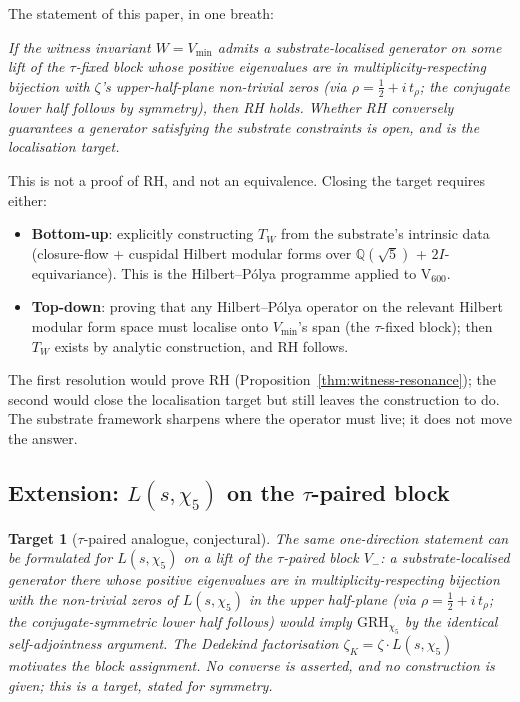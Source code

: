 \documentclass[11pt,a4paper]{article}
\newtheorem{target}[theorem]{Target}
\newcommand{\Q}{\mathbb{Q}}
\newcommand{\Vmin}{V_{\min}}
\newcommand{\Wit}{W}
\newcommand{\Twit}{T_W}
\begin{document}
\begin{equivbox}
The statement of this paper, in one breath:

\medskip
\noindent\itshape
If the witness invariant $\Wit = \Vmin$ admits a
substrate-localised generator on some lift of the $\tau$-fixed
block whose positive eigenvalues are in multiplicity-respecting
bijection with $\zeta$'s upper-half-plane non-trivial zeros (via
$\rho = \tfrac12 + i\,t_\rho$; the conjugate lower half follows
by symmetry), then RH holds. Whether RH conversely
guarantees a generator satisfying the substrate constraints is
open, and is the localisation target.

\medskip
\noindent\upshape
This is not a proof of RH, and not an equivalence. Closing the
target requires either:

\begin{itemize}[leftmargin=*]
  \item \textbf{Bottom-up}: explicitly constructing $\Twit$ from
        the substrate's intrinsic data (closure-flow + cuspidal
        Hilbert modular forms over $\Q(\sqrt 5)$ + $2I$-
        equivariance). This is the Hilbert--P\'olya programme
        applied to V$_{600}$.
  \item \textbf{Top-down}: proving that any
        Hilbert--P\'olya operator on the relevant Hilbert modular
        form space must localise onto $\Vmin$'s span (the
        $\tau$-fixed block); then $\Twit$ exists by analytic
        construction, and RH follows.
\end{itemize}

The first resolution would prove RH
(Proposition~\ref{thm:witness-resonance}); the second would close
the localisation target but still leaves the construction to do.
The substrate framework sharpens where the operator must live; it
does not move the answer.
\end{equivbox}

\subsection{Extension: $L(s, \chi_5)$ on the $\tau$-paired block}
\label{sec:chi5-extension}

\begin{target}[$\tau$-paired analogue, conjectural]
\label{prop:tau-paired-generator}
The same one-direction statement can be formulated for
$L(s,\chi_5)$ on a lift of the $\tau$-paired block $V_-$: a
substrate-localised generator there whose positive eigenvalues are
in multiplicity-respecting bijection with the non-trivial zeros of
$L(s,\chi_5)$ in the upper half-plane (via
$\rho = \tfrac12 + i\,t_\rho$; the conjugate-symmetric lower
half follows) would imply $\mathrm{GRH}_{\chi_5}$ by the
identical self-adjointness argument. The Dedekind
factorisation $\zeta_K = \zeta \cdot L(s,\chi_5)$ motivates the
block assignment. No converse is asserted, and no construction is
given; this is a target, stated for symmetry.
\end{target}
\end{document}

